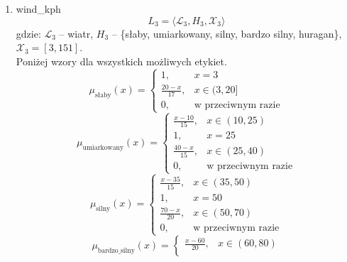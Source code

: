 \documentclass{article}
\begin{document}
\begin{enumerate}
    \item wind\_kph
        \begin{equation}
            L_3 = \langle \mathcal{L}_3, H_3, \mathcal{X}_3 \rangle
        \end{equation}
        gdzie: $\mathcal{L}_3$ – wiatr, $H_3$ – \{słaby, umiarkowany, silny, bardzo silny, huragan\}, $\mathcal{X}_3 = [3, 151]$. \\
        Poniżej wzory dla wszystkich możliwych etykiet.
                  \begin{equation}
                    \mu_{\text{słaby}}(x) =
                    \begin{cases}
                    1, & x = 3 \\
                    \frac{20 - x}{17}, & x \in (3, 20] \\
                    0, & \text{w przeciwnym razie}
                    \end{cases}
                  \end{equation}
                \begin{equation}
                    \mu_{\text{umiarkowany}}(x) =
                    \begin{cases}
                    \frac{x - 10}{15}, & x \in (10, 25) \\
                    1, & x = 25 \\
                    \frac{40 - x}{15}, & x \in (25, 40) \\
                    0, & \text{w przeciwnym razie}
                    \end{cases}
                  \end{equation}
                \begin{equation}
                    \mu_{\text{silny}}(x) =
                    \begin{cases}
                    \frac{x - 35}{15}, & x \in (35, 50) \\
                    1, & x = 50 \\
                    \frac{70 - x}{20}, & x \in (50, 70) \\
                    0, & \text{w przeciwnym razie}
                    \end{cases}
              \end{equation}
                \begin{equation}
                    \mu_{\text{bardzo\_silny}}(x) =
                    \begin{cases}
                    \frac{x - 60}{20}, & x \in (60, 80) \\

\end{cases}
\end{equation}
\end{enumerate}
\end{document}
